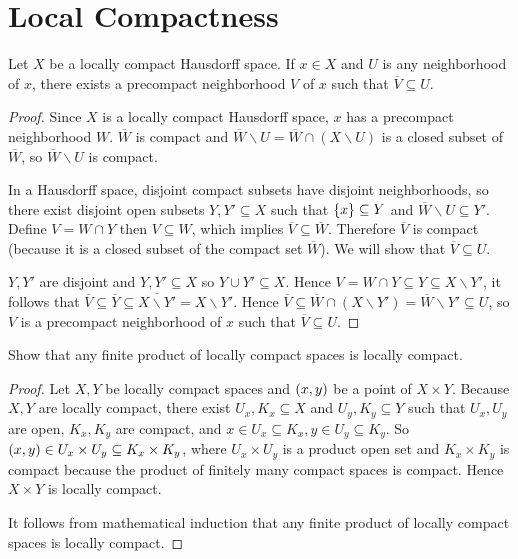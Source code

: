 \section*{Local Compactness}

\begin{lemma}{4.65}
	Let $X$ be a locally compact Hausdorff space. If $x\in X$ and $U$ is any neighborhood of $x$, there exists a precompact neighborhood $V$ of $x$ such that $\overline{V} \subseteq U$.
\end{lemma}

\begin{proof}
	Since $X$ is a locally compact Hausdorff space, $x$ has a precompact neighborhood $W$. $\overline{W}$ is compact and $\overline{W}\smallsetminus U = \overline{W} \cap (X\smallsetminus U)$ is a closed subset of $\overline{W}$, so $\overline{W}\smallsetminus U$ is compact.

	In a Hausdorff space, disjoint compact subsets have disjoint neighborhoods, so there exist disjoint open subsets $Y, Y'\subseteq X$ such that $\left\{{x}\right\} \subseteq Y$ and $\overline{W}\smallsetminus U \subseteq Y'$. Define $V = W\cap Y$ then $V \subseteq W$, which implies $\overline{V} \subseteq \overline{W}$. Therefore $\overline{V}$ is compact (because it is a closed subset of the compact set $\overline{W}$). We will show that $\overline{V}\subseteq U$.

	$Y, Y'$ are disjoint and $Y, Y'\subseteq X$ so $Y\cup Y' \subseteq X$. Hence $V = W\cap Y \subseteq Y \subseteq X\smallsetminus Y'$, it follows that $\overline{V} \subseteq \overline{Y} \subseteq \overline{X\smallsetminus Y'} = X\smallsetminus Y'$. Hence $\overline{V} \subseteq \overline{W} \cap (X\smallsetminus Y') = \overline{W} \smallsetminus Y' \subseteq U$, so $V$ is a precompact neighborhood of $x$ such that $\overline{V} \subseteq U$.
\end{proof}

\begin{exercise}{4.67}
	Show that any finite product of locally compact spaces is locally compact.
\end{exercise}

\begin{proof}
	Let $X, Y$ be locally compact spaces and $\left({x, y}\right)$ be a point of $X\times Y$. Because $X, Y$ are locally compact, there exist $U_{x}, K_{x} \subseteq X$ and $U_{y}, K_{y} \subseteq Y$ such that $U_{x}, U_{y}$ are open, $K_{x}, K_{y}$ are compact, and $x\in U_{x} \subseteq K_{x}, y\in U_{y} \subseteq K_{y}$. So $\left({x, y}\right) \in U_{x}\times U_{y} \subseteq K_{x} \times K_{y}$, where $U_{x}\times U_{y}$ is a product open set and $K_{x}\times K_{y}$ is compact because the product of finitely many compact spaces is compact. Hence $X\times Y$ is locally compact.

	It follows from mathematical induction that any finite product of locally compact spaces is locally compact.
\end{proof}

